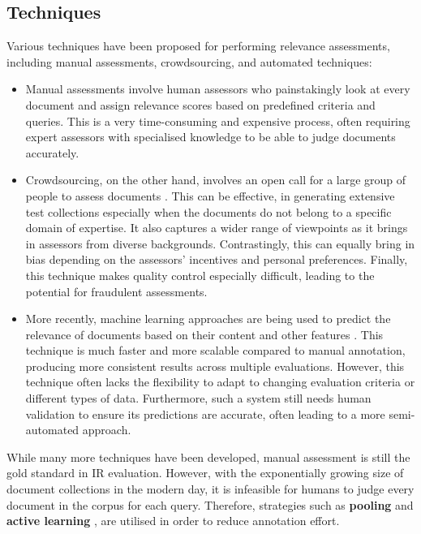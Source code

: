 \documentclass{l4proj}
\begin{document}
\subsection{Techniques}
Various techniques have been proposed for performing relevance assessments, including manual assessments, crowdsourcing, and automated techniques:
\begin{itemize}
    \item Manual assessments involve human assessors who painstakingly look at every document and assign relevance scores based on predefined criteria and queries. This is a very time-consuming and expensive process, often requiring expert assessors with specialised knowledge to be able to judge documents accurately. 

    \item Crowdsourcing, on the other hand, involves an open call for a large group of people to assess documents \citep{samimi2014creation}. This can be effective, in generating extensive test collections especially when the documents do not belong to a specific domain of expertise. It also captures a wider range of viewpoints as it brings in assessors from diverse backgrounds. Contrastingly, this can equally bring in bias depending on the assessors' incentives and personal preferences. Finally, this technique makes quality control especially difficult, leading to the potential for fraudulent assessments.
    
    \item More recently, machine learning approaches are being used to predict the relevance of documents based on their content and other features \citep{cao2007ltr}. This technique is much faster and more scalable compared to manual annotation, producing more consistent results across multiple evaluations. However, this technique often lacks the flexibility to adapt to changing evaluation criteria or different types of data. Furthermore, such a system still needs human validation to ensure its predictions are accurate, often leading to a more semi-automated approach.
\end{itemize}

While many more techniques have been developed, manual assessment is still the gold standard in IR evaluation. However, with the exponentially growing size of document collections in the modern day, it is infeasible for humans to judge every document in the corpus for each query. Therefore, strategies such as \textbf{pooling} and \textbf{active learning} \citep{rahman2020testal}, are utilised in order to reduce annotation effort.
\end{document}
